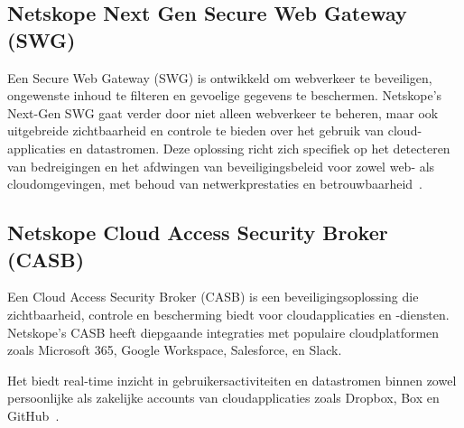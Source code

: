 \subsection{Netskope Next Gen Secure Web Gateway (SWG)}
Een Secure Web Gateway (SWG) is ontwikkeld om webverkeer te beveiligen, ongewenste inhoud te filteren en gevoelige gegevens te beschermen. Netskope's Next-Gen SWG gaat verder door niet alleen webverkeer te beheren, maar ook uitgebreide zichtbaarheid en controle te bieden over het gebruik van cloud-applicaties en datastromen.
Deze oplossing richt zich specifiek op het detecteren van bedreigingen en het afdwingen van beveiligingsbeleid voor zowel web- als cloudomgevingen, met behoud van netwerkprestaties en betrouwbaarheid~\autocite{Netskope2025-3}.

\subsection{Netskope Cloud Access Security Broker (CASB)}
Een Cloud Access Security Broker (CASB) is een beveiligingsoplossing die zichtbaarheid, controle en bescherming biedt voor cloudapplicaties en -diensten. Netskope's CASB heeft diepgaande integraties met populaire cloudplatformen zoals Microsoft 365, Google Workspace, Salesforce, en Slack.

Het biedt real-time inzicht in gebruikersactiviteiten en datastromen binnen zowel persoonlijke als zakelijke accounts van cloudapplicaties zoals Dropbox, Box en GitHub~\autocite{Netskope2025-4}.

